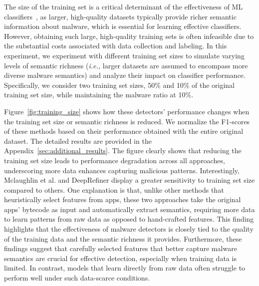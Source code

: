 The size of the training set is a critical determinant of the effectiveness of ML classifiers~\cite{sun2017revisiting}, as larger, high-quality datasets typically provide richer semantic information about malware, which is essential for learning effective classifiers.
However, obtaining such large, high-quality training sets is often infeasible due to the substantial costs associated with data collection and labeling.
In this experiment, we experiment with different training set sizes to simulate varying levels of semantic richness (\textit{i.e.,} larger datasets are assumed to encompass more diverse malware semantics) and analyze their impact on classifier performance.
Specifically, we consider two training set sizes, 50\% and 10\% of the original training set size, while maintaining the malware ratio at 10\%.

Figure~\ref{fig:training_size} shows how these detectors' performance changes when the training set size or semantic richness is reduced.
We normalize the F1-scores of these methods based on their performance obtained with the entire original dataset.
The detailed results are provided in the Appendix~\ref{sec:additional_results}.
The figure clearly shows that reducing the training set size leads to performance degradation across all approaches, underscoring more data enhances capturing malicious patterns.
Interestingly, Mclaughlin et al. and DeepRefiner display a greater sensitivity to training set size compared to others.
One explanation is that, unlike other methods that heuristically select features from apps, these two approaches take the original apps' bytecode as input and automatically extract semantics, requiring more data to learn patterns from raw data as opposed to hand-crafted features.
This finding highlights that the effectiveness of malware detectors is closely tied to the quality of the training data and the semantic richness it provides.
Furthermore, these findings suggest that carefully selected features that better capture malware semantics are crucial for effective detection, especially when training data is limited.
In contrast, models that learn directly from raw data often struggle to perform well under such data-scarce conditions.


